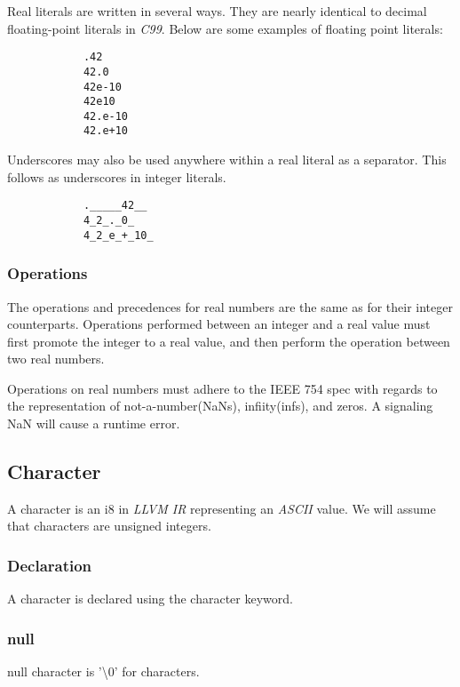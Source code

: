 \documentclass[../../gazprea.tex]{subfiles}
\begin{document}
		Real literals are written in several ways. They are nearly identical to decimal floating-point literals in
		\textit{C99}. Below are some examples of floating point literals:

		\begin{lstlisting}
			.42
			42.0
			42e-10
			42e10
			42.e-10
			42.e+10
		\end{lstlisting}

		Underscores may also be used anywhere within a real literal as a separator.  This follows as underscores in
		integer literals.

		\begin{lstlisting}
			._____42__
			4_2_._0_
			4_2_e_+_10_
		\end{lstlisting}

	\subsubsection{Operations}

		The operations and precedences for real numbers are the same as for their integer counterparts. Operations
		performed between an integer and a real value must first promote the integer to a real value, and then perform
		the operation between two real numbers.

		Operations on real numbers must adhere to the \textsf{IEEE 754} spec with regards to the representation of
		not-a-number(NaNs), infiity(infs), and zeros. A signaling NaN will cause a runtime error.


	\subsection{Character}\label{sec:character}

		A character is an \textsf{i8} in \textit{LLVM IR} representing an \textit{ASCII} value. We will assume that
		characters are unsigned integers.

	\subsubsection{Declaration}

		A character is declared using the \textsf{character} keyword.

	\subsubsection{null}

		\textsf{null} character is \textsf{'\textbackslash0'} for characters.
\end{document}
